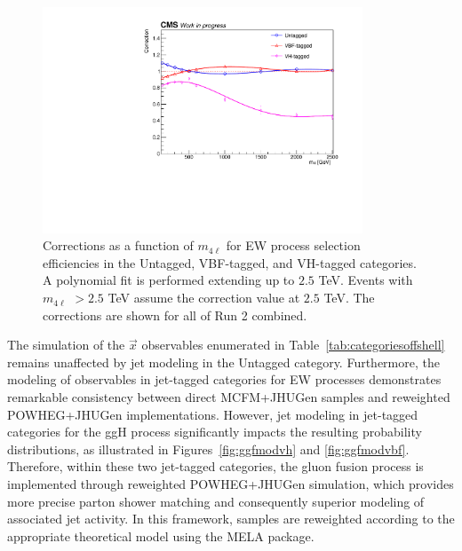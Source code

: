 \begin{figure}[!hbt]
\centering
\includegraphics[width=0.85\textwidth]{figures/Corrections_allyears.pdf}
\caption {
Corrections as a function of $m_{4\ell}$ for \offshell EW process selection efficiencies in the Untagged, VBF-tagged, and VH-tagged categories. A polynomial fit is performed extending up to $2.5$ TeV. Events with $m_{4\ell}$ $ >  2.5$ TeV assume the correction value at $2.5$ TeV. The corrections are shown for all of Run 2 combined.
\label{fig:ew_catcor}}
\end{figure}

The simulation of the $\vec{x}$ observables enumerated in Table~\ref{tab:categoriesoffshell} remains unaffected by jet modeling in the Untagged category. Furthermore, the modeling of observables in jet-tagged categories for EW processes demonstrates remarkable consistency between direct MCFM+JHUGen samples and reweighted POWHEG+JHUGen implementations. However, jet modeling in jet-tagged categories for the ggH process significantly impacts the resulting probability distributions, as illustrated in Figures~\ref{fig:ggfmodvh} and \ref{fig:ggfmodvbf}. 
Therefore, within these two jet-tagged categories, the gluon fusion process is implemented through reweighted POWHEG+JHUGen simulation, which provides more precise parton shower matching and consequently superior modeling of associated jet activity. In this framework, samples are reweighted according to the appropriate theoretical model using the MELA package.

